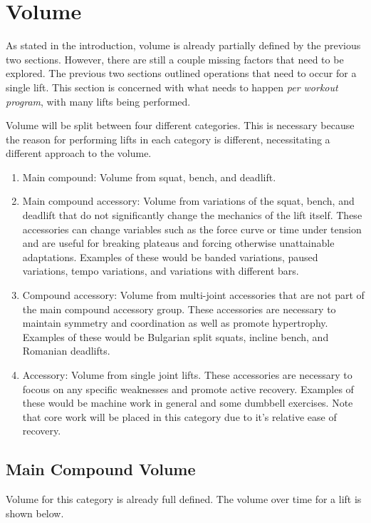 \section{Volume}

As stated in the introduction, volume is already partially defined by the previous two sections. However, there are still a couple missing factors that need to be explored. The previous two sections outlined operations that need to occur for a single lift. This section is concerned with what needs to happen \textit{per workout program}, with many lifts being performed.

Volume will be split between four different categories. This is necessary because the reason for performing lifts in each category is different, necessitating a different approach to the volume.

\begin{enumerate}
    \item Main compound: Volume from squat, bench, and deadlift.
    \item Main compound accessory: Volume from variations of the squat, bench, and deadlift that do not significantly change the mechanics of the lift itself. These accessories can change variables such as the force curve or time under tension and are useful for breaking plateaus and forcing otherwise unattainable adaptations. Examples of these would be banded variations, paused variations, tempo variations, and variations with different bars.
    \item Compound accessory: Volume from multi-joint accessories that are not part of the main compound accessory group. These accessories are necessary to maintain symmetry and coordination as well as promote hypertrophy. Examples of these would be Bulgarian split squats, incline bench, and Romanian deadlifts.
    \item Accessory: Volume from single joint lifts. These accessories are necessary to focous on any specific weaknesses and promote active recovery. Examples of these would be machine work in general and some dumbbell exercises. Note that core work will be placed in this category due to it's relative ease of recovery.
\end{enumerate}


\subsection{Main Compound Volume}

Volume for this category is already full defined. The volume over time for a lift is shown below.

